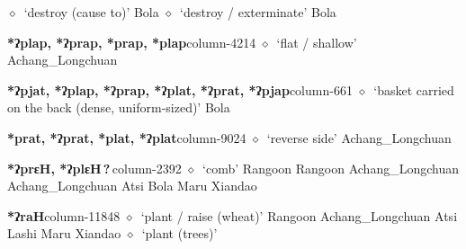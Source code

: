         $\diamond$~`destroy (cause to)'
         Bola 
\hspace{1ex}
         $\diamond$~`destroy / exterminate'
         Bola 
  \item {\footnotesize \textbf{*ʔplap, *ʔprap, *prap, *plap}}{\tiny column-4214}
         $\diamond$~`flat / shallow'
         Achang\_Longchuan 
  \item {\footnotesize \textbf{*ʔpjat, *ʔplap, *ʔprap, *ʔplat, *ʔprat, *ʔpjap}}{\tiny column-661}
         $\diamond$~`basket carried on the back (dense, uniform-sized)'
         Bola 
  \item {\footnotesize \textbf{*prat, *ʔprat, *plat, *ʔplat}}{\tiny column-9024}
         $\diamond$~`reverse side'
         Achang\_Longchuan 
  \item {\footnotesize \textbf{*ʔprɛH, *ʔplɛH\,?\,}}{\tiny column-2392}
         $\diamond$~`comb'
         Rangoon 
\hspace{1ex}
         Rangoon 
\hspace{1ex}
         Achang\_Longchuan 
\hspace{1ex}
         Achang\_Longchuan 
\hspace{1ex}
         Atsi 
\hspace{1ex}
         Bola 
\hspace{1ex}
         Maru 
\hspace{1ex}
         Xiandao 
  \item {\footnotesize \textbf{*ʔraH}}{\tiny column-11848}
         $\diamond$~`plant / raise (wheat)'
         Rangoon 
\hspace{1ex}
         Achang\_Longchuan 
\hspace{1ex}
         Atsi 
\hspace{1ex}
         Lashi 
\hspace{1ex}
         Maru 
\hspace{1ex}
         Xiandao 
\hspace{1ex}
         $\diamond$~`plant (trees)'
